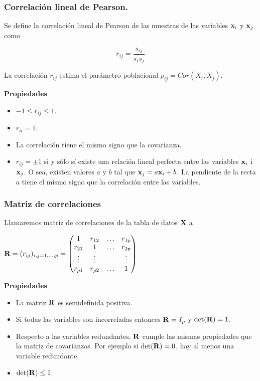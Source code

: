 \begin{frame}
\frametitle{Correlación lineal de Pearson.}

Se define la correlación lineal de Pearson de las muestras de  las variables $\mathbf{x}_i$ y $\mathbf{x}_j$ como 

$$r_{i j}=\frac{s_{i j}}{s_i s_j}$$

La correlación $r_{i j}$ estima el parámetro poblacional $\rho_{i j}=Cor(X_i,X_j)$.


\textbf{Propiedades}
\begin{itemize}
\item $-1\leq r_{i j}\leq 1.$
\item $r_{i i}=1$.
\item La correlación tiene el mismo signo que la covarianza.
\item $r_{i j}=\pm 1$ si y sólo sí existe una relación lineal perfecta entre las variables $\mathbf{x}_i$ i $\mathbf{x}_j$. O sea, existen valores $a$ y $b$ tal que $\mathbf{x}_j= a \mathbf{x}_i +b$. La pendiente de la recta $a$ tiene el mismo signo que la correlación entre las variables.
\end{itemize}
\end{frame}

\begin{frame}
\frametitle{Matriz de correlaciones}

Llamaremos matriz de correlaciones de la tabla de datos $\mathbf{X}$ a 

$\mathbf{R}=(r_{i j})_{i,j=1,\ldots,p}=
\begin{pmatrix}
1 & r_{1 2} & \ldots & r_{1 p}\\
r_{2 1} & 1 & \ldots & r_{2 p}\\
\vdots & \vdots & & \vdots\\
r_{p 1} & r_{p 2} & \ldots & 1
\end{pmatrix}$
 
\textbf{Propiedades}
\begin{itemize}
\item La matriz $\mathbf{R}$ es semidefinida positiva.
\item Si todas las variables son incorreladas entonces $\mathbf{R}=I_p$ y $\det(\mathbf{R})=1$.
\item  Respecto a las variables redundantes, $\mathbf{R}$ cumple las mismas propiedades que la matriz de covarianzas. Por ejemplo si $\det(\mathbf{R})=0$, hay al menos una variable redundante.
\item $\det(\mathbf{R})\leq 1$.
\end{itemize}

\end{frame}

